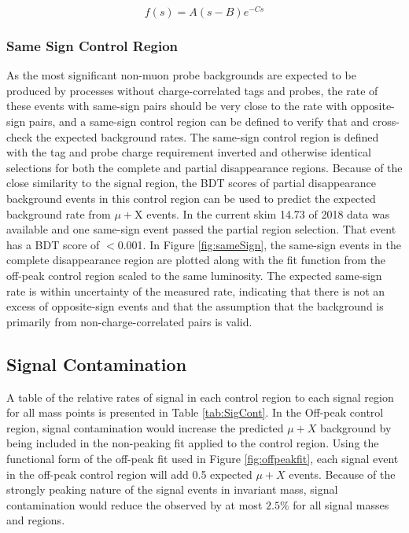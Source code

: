 \begin{equation} \label{eq:bkgfunc}
f(s)=A(s-B)e^{-Cs} 
\end{equation}
\subsubsection{Same Sign Control Region}
\label{sec:sameSign}
As the most significant non-muon probe backgrounds are expected to be produced by processes without charge-correlated tags and probes, the rate of these events with same-sign pairs should be very close to the rate with opposite-sign pairs, and a same-sign control region can be defined to verify that and cross-check the expected background rates. The same-sign control region is defined with the tag and probe charge requirement inverted and otherwise identical selections for both the complete and partial disappearance regions. Because of the close similarity to the signal region, the BDT scores of partial disappearance background events in this control region can be used to predict the expected background rate from $\mu+$X events. In the current skim 14.73 \fbinv of 2018 data was available and one same-sign event passed the partial region selection. That event has a BDT score of $<$0.001. In Figure \ref{fig:sameSign}, the same-sign events in the complete disappearance region are plotted along with the fit function from the off-peak control region scaled to the same luminosity. The expected same-sign rate is within uncertainty of the measured rate, indicating that there is not an excess of opposite-sign events and that the assumption that the background is primarily from non-charge-correlated pairs is valid.
\subsection{Signal Contamination}
\label{sec:SigContamination}
A table of the relative rates of signal in each control region to each signal region for all mass points is presented in Table \ref{tab:SigCont}.
In the Off-peak control region, signal contamination would increase the predicted $\mu+X$ background by being included in the non-peaking fit applied to the control region. Using the functional form of the off-peak fit used in Figure \ref{fig:offpeakfit}, each signal event in the off-peak control region will add 0.5 expected $\mu+X$ events. Because of the strongly peaking nature of the signal events in invariant mass, signal contamination would reduce the observed by at most $2.5\%$ for all signal masses and regions.

